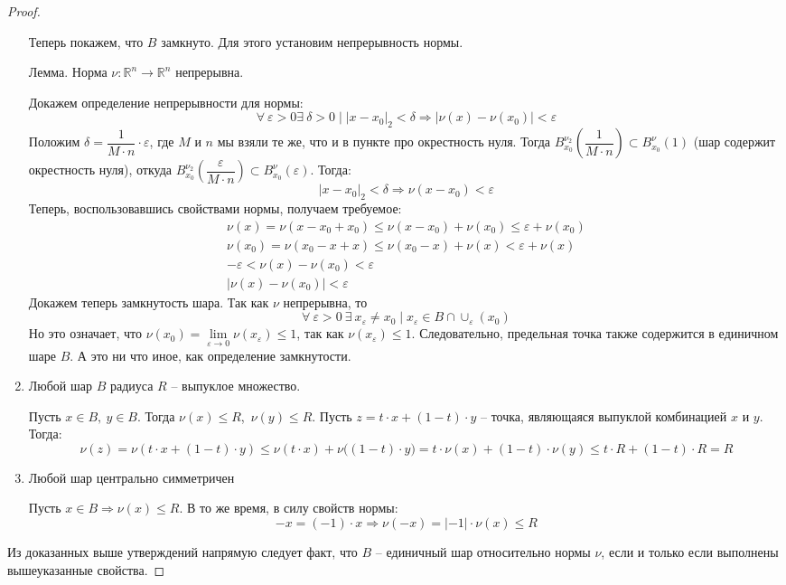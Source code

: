 \documentclass[12pt]{article}
\begin{document}
\begin{proof}
\begin{enumerate}
			Теперь покажем, что $B$ замкнуто. Для этого установим непрерывность нормы.
			
			$\textbf{Лемма}$. Норма $\nu : \mathbb{R}^n \to \mathbb{R}^n$ непрерывна.
			
			Докажем определение непрерывности для нормы: 
			\[\forall\ \varepsilon > 0 \exists\ \delta > 0 \mid |x - x_0|_2 < \delta \Rightarrow |\nu(x) - \nu(x_0)| < \varepsilon\]
			Положим $\delta = \dfrac{1}{M \cdot n} \cdot \varepsilon$, где $M$ и $n$ мы взяли те же, что и в пункте про окрестность нуля. Тогда $B_{x_0}^{\nu_2}\left(\dfrac{1}{M \cdot n}\right) \subset B_{x_0}^{\nu}(1)$ (шар содержит окрестность нуля), откуда $B_{x_0}^{\nu_2}\left(\dfrac{\varepsilon}{M \cdot n}\right) \subset B_{x_0}^{\nu}(\varepsilon)$. Тогда:
			\[|x - x_0|_2 < \delta \Longrightarrow \nu(x - x_0) < \varepsilon\]
			Теперь, воспользовавшись свойствами нормы, получаем требуемое:
			\begin{gather*}
				\nu(x) = \nu(x - x_0 + x_0) \leqslant \nu(x - x_0) + \nu(x_0) \leqslant \varepsilon + \nu(x_0)\\
				\nu(x_0) = \nu(x_0 - x + x) \leqslant \nu(x_0 - x) + \nu(x) < \varepsilon + \nu(x)\\
				-\varepsilon < \nu(x) - \nu(x_0) < \varepsilon \\
				|\nu(x) - \nu(x_0)| < \varepsilon
			\end{gather*}
			Докажем теперь замкнутость шара. Так как $\nu$ непрерывна, то 
			\[\forall\ \varepsilon > 0\ \exists\ x_\varepsilon \neq x_0 \mid x_\varepsilon \in B \cap \cup_\varepsilon(x_0)\]
			Но это означает, что $\nu(x_0) = \displaystyle\lim\limits_{\varepsilon \to 0} \nu(x_\varepsilon) \leqslant 1$, так как $\nu(x_\varepsilon) \leqslant 1$. Следовательно, предельная точка также содержится в единичном шаре $B$.  А это ни что иное, как определение замкнутости.
			\item Любой шар $B$ радиуса $R$ -- выпуклое множество.
			
			Пусть $x \in B,\ y \in B$. Тогда $\nu(x) \leqslant R$,\ $\nu(y) \leqslant R$. Пусть $z = t \cdot x + (1 - t) \cdot y$ -- точка, являющаяся выпуклой комбинацией $x$ и $y$. Тогда:
			\[\nu(z) = \nu(t \cdot x + (1 - t) \cdot y) \leqslant \nu(t \cdot x) + \nu\big((1 - t) \cdot y\big) = t \cdot \nu (x) + (1 - t) \cdot \nu(y) \leqslant t \cdot R + (1 - t) \cdot R = R\]
			
			\item Любой шар центрально симметричен
			
			Пусть $x \in B \Rightarrow \nu(x) \leqslant R$. В то же время, в силу свойств нормы:
			\[-x = (-1) \cdot x \Rightarrow \nu(-x) = |-1| \cdot \nu(x) \leqslant R\] 
				
			\end{enumerate}
			
			Из доказанных выше утверждений напрямую следует факт, что $B$ -- единичный шар относительно нормы $\nu$, если и только если выполнены вышеуказанные свойства.
		
	\end{proof}
\end{document}
